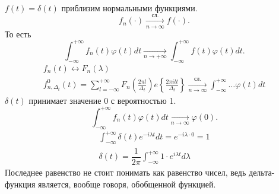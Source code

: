 $f(t) = \delta(t)$ приблизим нормальными функциями.\\
$$f_n(\cdot) \xrightarrow[n\to\infty]{\text{сл.}} f(\cdot).$$
То есть
$$\int_{-\infty}^{+\infty} f_n(t) \varphi(t) dt \xrightarrow[n \to +\infty]{} \int_{-\infty}^{+\infty} f(t) \varphi(t) dt.$$
\begin{gather*}
f_n(t) \longleftrightarrow F_n(\lambda)\\
f_{n,\Delta_t}^0 (t) = \sum_{l=-\infty}^{+\infty} F_n\left(\frac{2\pi l}{\Delta_t}\right) e\left\{\frac{2\pi i l t}{\Delta_t} \right\} \xrightarrow[n\to\infty]{\text{сл.}} \int_{-\infty}^{+\infty} \dots \varphi(t) dt
\end{gather*}
$\delta(t)$ принимает значение 0 с вероятностью 1.
$$\int_{-\infty}^{+\infty} f_n(t) \varphi(t) dt \xrightarrow[n\to\infty]{} \varphi(0).$$
\begin{gather*}
\int_{-\infty}^{+\infty} \delta(t) e^{-i\lambda t} dt = e^{-i\lambda \cdot 0} = 1\\
\delta(t) = \dfrac{1}{2\pi} \int_{-\infty}^{+\infty} 1 \cdot e^{i\lambda t} d\lambda
\end{gather*}
Последнее равенство не стоит понимать как равенство чисел, ведь дельта-функция является, вообще говоря, обобщенной функцией.\\
\begin{center}
\end{center}

